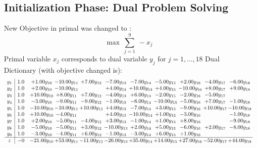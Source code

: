 \documentclass[9pt]{article}
\begin{document}
\subsection{Initialization Phase: Dual Problem Solving}
New Objective in primal was changed to : \[ \max\ \sum_{j=1}^{9}\ - x_j \] 
Primal variable $x_j$ corresponds to dual variable $y_j$ for $j = 1,\ldots,18$
Dual Dictionary (with objective changed is): 
\[\begin{array}{c| c c@{\hskip 2pt} c@{\hskip 2pt} c@{\hskip 2pt} c@{\hskip 2pt} c@{\hskip 2pt} c@{\hskip 2pt} c@{\hskip 2pt} c@{\hskip 2pt} c@{\hskip 2pt} }
 y_{1}   &  1.0 & +  1.00 y_{10} & -10.00 y_{11} & +  7.00 y_{12} & -7.00 y_{13} & -7.00 y_{14} & -5.00 y_{15} & +  2.00 y_{16} & -4.00 y_{17} & -6.00 y_{18}\\
 y_{2}   &  1.0 & +  2.00 y_{10} & -10.00 y_{11} &   & +  4.00 y_{13} & + 10.00 y_{14} & +  4.00 y_{15} & -10.00 y_{16} & +  8.00 y_{17} & +  9.00 y_{18}\\
 y_{3}   &  1.0 & + 10.00 y_{10} & +  8.00 y_{11} & +  7.00 y_{12} & -4.00 y_{13} & +  6.00 y_{14} & -2.00 y_{15} & -2.00 y_{16} & -5.00 y_{17} &   \\
 y_{4}   &  1.0 & -3.00 y_{10} & -9.00 y_{11} & -9.00 y_{12} & -1.00 y_{13} & -6.00 y_{14} & -10.00 y_{15} & -5.00 y_{16} & +  7.00 y_{17} & -1.00 y_{18}\\
 y_{5}   &  1.0 & -10.00 y_{10} & -10.00 y_{11} & + 10.00 y_{12} & +  4.00 y_{13} & -7.00 y_{14} & +  3.00 y_{15} & -9.00 y_{16} & + 10.00 y_{17} & -10.00 y_{18}\\
 y_{6}   &  1.0 & + 10.00 y_{10} & -4.00 y_{11} &   & +  4.00 y_{13} & -10.00 y_{14} & +  1.00 y_{15} & -3.00 y_{16} &   & -1.00 y_{18}\\
 y_{7}   &  1.0 & +  2.00 y_{10} & -5.00 y_{11} & -4.00 y_{12} & +  3.00 y_{13} & -1.00 y_{14} & +  1.00 y_{15} & +  8.00 y_{16} &   & -9.00 y_{18}\\
 y_{8}   &  1.0 & -5.00 y_{10} & -5.00 y_{11} & +  3.00 y_{12} & -10.00 y_{13} & +  2.00 y_{14} & +  5.00 y_{15} & -6.00 y_{16} & +  2.00 y_{17} & -8.00 y_{18}\\
 y_{9}   &  1.0 & -3.00 y_{10} & -4.00 y_{11} & +  6.00 y_{12} & -1.00 y_{13} & -3.00 y_{14} & +  6.00 y_{15} & +  1.00 y_{16} &    &   \\
\hline
z    &  -0 & -21.00 y_{10} & + 53.00 y_{11} & -11.00 y_{12} & -26.00 y_{13} & + 35.00 y_{14} & + 14.00 y_{15} & + 27.00 y_{16} & -52.00 y_{17} & + 44.00 y_{18}\\
\end{array}\]
\end{document}
